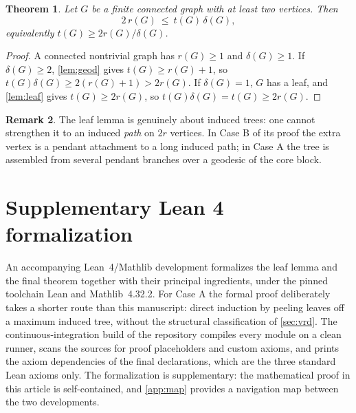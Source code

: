 \documentclass[11pt]{article}
\newtheorem{theorem}{Theorem}[section]
\theoremstyle{definition}
\newtheorem{remark}[theorem]{Remark}
\begin{document}
\begin{theorem}\label{thm:main}
Let $G$ be a finite connected graph with at least two vertices.  Then
\[
        2\,r(G)\ \le\ t(G)\,\delta(G),
\]
equivalently $t(G)\ge 2r(G)/\delta(G)$.
\end{theorem}

\begin{proof}
A connected nontrivial graph has $r(G)\ge1$ and $\delta(G)\ge1$.
If $\delta(G)\ge2$, \cref{lem:geod} gives $t(G)\ge r(G)+1$, so
$t(G)\delta(G)\ge 2(r(G)+1)>2r(G)$.
If $\delta(G)=1$, $G$ has a leaf, and \cref{lem:leaf} gives
$t(G)\ge2r(G)$, so $t(G)\delta(G)=t(G)\ge2r(G)$.
\end{proof}

\begin{remark}
The leaf lemma is genuinely about induced trees: one cannot strengthen it to
an induced \emph{path} on $2r$ vertices.  In Case B of its proof the extra
vertex is a pendant attachment to a long induced path; in Case A the tree is
assembled from several pendant branches over a geodesic of the core block.
\end{remark}

\section{Supplementary Lean 4 formalization}\label{sec:lean}

An accompanying Lean~4/Mathlib development formalizes the leaf lemma and the
final theorem together with their principal ingredients, under the pinned
toolchain Lean and Mathlib~4.32.2.  For Case A the formal proof deliberately
takes a shorter route than this manuscript: direct induction by peeling
leaves off a maximum induced tree, without the structural classification of
\cref{sec:vrd}.  The continuous-integration build of the repository compiles
every module on a clean runner, scans the sources for proof placeholders and
custom axioms, and prints the axiom dependencies of the final declarations,
which are the three standard Lean axioms only.  The formalization is
supplementary: the mathematical proof in this article is self-contained, and
\cref{app:map} provides a navigation map between the two developments.
\end{document}
